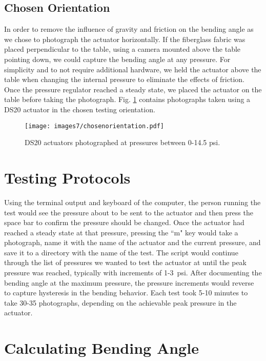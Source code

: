 \clearpage
\subsection{Chosen Orientation}

In order to remove the influence of gravity and friction on the bending angle as we chose to photograph the actuator horizontally. If the fiberglass fabric was placed perpendicular to the table, using a camera mounted above the table pointing down, we could capture the bending angle at any pressure. For simplicity and to not require additional hardware, we held the actuator above the table when changing the internal pressure to eliminate the effects of friction. Once the pressure regulator reached a steady state, we placed the actuator on the table before taking the photograph. Fig. \ref{fig:chosenorientation} contains photographs taken using a DS20 actuator in the chosen testing orientation. 

\begin{figure}[!ht]
    \centering
    \texttt{[image: images7/chosenorientation.pdf]}
    \caption{DS20 actuators photographed at pressures between 0-14.5 psi.}
    \label{fig:chosenorientation}
\end{figure}

\clearpage
\section{Testing Protocols}

Using the terminal output and keyboard of the computer, the person running the test would see the pressure about to be sent to the actuator and then press the space bar to confirm the pressure should be changed. Once the actuator had reached a steady state at that pressure, pressing the ``m" key would take a photograph, name it with the name of the actuator and the current pressure, and save it to a directory with the name of the test. The script would continue through the list of pressures we wanted to test the actuator at until the peak pressure was reached, typically with increments of 1-3~psi. After documenting the bending angle at the maximum pressure, the pressure increments would reverse to capture hysteresis in the bending behavior. Each test took 5-10 minutes to take 30-35 photographs, depending on the achievable peak pressure in the actuator.

\section{Calculating Bending Angle}

